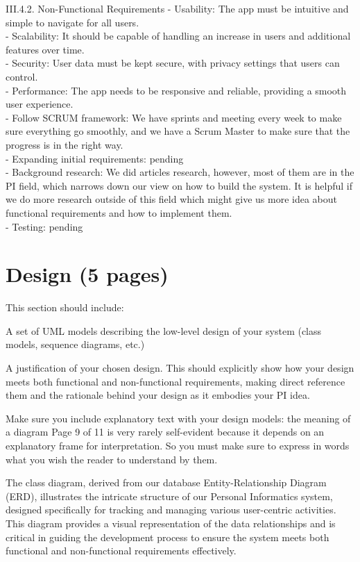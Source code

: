 \documentclass[12pt]{article}
\begin{document}
III.4.2. Non-Functional Requirements
-    Usability: The app must be intuitive and simple to navigate for all users.\\
-    Scalability: It should be capable of handling an increase in users and additional features over time.\\
-    Security: User data must be kept secure, with privacy settings that users can control.\\
-    Performance: The app needs to be responsive and reliable, providing a smooth user experience.\\
-    Follow SCRUM framework: We have sprints and meeting every week to make sure everything go smoothly, and we have a Scrum Master to make sure that the progress is in the right way.\\
-    Expanding initial requirements: pending\\
-    Background research: We did articles research, however, most of them are in the PI field, which narrows down our view on how to build the system. It is helpful if we do more research outside of this field which might give us more idea about functional requirements and how to implement them.\\
-    	Testing: pending\\



\section{Design (5 pages)}

This section should include:

A set of UML models describing the low-level design of your system (class models,
sequence diagrams, etc.)

A justification of your chosen design. This should explicitly show how your design
meets both functional and non-functional requirements, making direct reference
them and the rationale behind your design as it embodies your PI idea.

Make sure you include explanatory text with your design models: the meaning of a diagram
Page 9 of 11
is very rarely self-evident because it depends on an explanatory frame for interpretation. So
you must make sure to express in words what you wish the reader to understand by them.


The class diagram, derived from our database Entity-Relationship Diagram (ERD), illustrates the intricate structure of our Personal Informatics system, designed specifically for tracking and managing various user-centric activities. This diagram provides a visual representation of the data relationships and is critical in guiding the development process to ensure the system meets both functional and non-functional requirements effectively.\par
\end{document}
